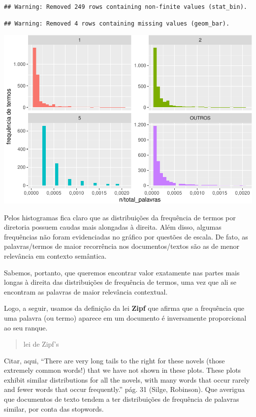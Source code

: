 \documentclass[]{article}
\begin{document}
\begin{verbatim}
## Warning: Removed 249 rows containing non-finite values (stat_bin).
\end{verbatim}

\begin{verbatim}
## Warning: Removed 4 rows containing missing values (geom_bar).
\end{verbatim}

\includegraphics{markdown_v50_files/figure-latex/unnamed-chunk-37-1.pdf}

Pelos histogramas fica claro que as distribuições da frequência de
termos por diretoria possuem caudas mais alongadas à direita. Além
disso, algumas frequências não foram evidenciadas no gráfico por
questões de escala. De fato, as palavras/termos de maior recorrência nos
documentos/textos são as de menor relevância em contexto semântica.

Sabemos, portanto, que queremos encontrar valor exatamente nas partes
mais longas à direita das distribuições de frequência de termos, uma vez
que ali se encontram as palavras de maior relevância contextual.

Logo, a seguir, usamos da definição da lei \textbf{Zipf} que afirma que
a frequência que uma palavra (ou termo) aparece em um documento é
inversamente proporcional ao seu ranque.

\begin{quote}
lei de Zipf's
\end{quote}

Citar, aqui, ``There are very long tails to the right for these novels
(those extremely common words!) that we have not shown in these plots.
These plots exhibit similar distributions for all the novels, with many
words that occur rarely and fewer words that occur frequently.'' pág. 31
(Silge, Robinson). Que averigua que documentos de texto tendem a ter
distribuições de frequência de palavras similar, por conta das
stopwords.
\end{document}
